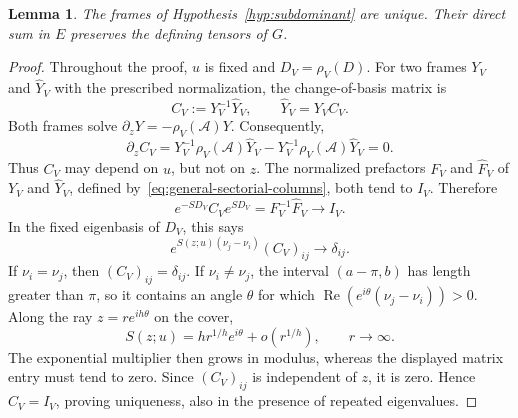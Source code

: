 \documentclass[11pt,leqno]{amsart}
\numberwithin{equation}{section}
\theoremstyle{plain}
\newtheorem{lemma}[theorem]{Lemma}
\theoremstyle{definition}
\theoremstyle{plain}
\theoremstyle{definition}
\theoremstyle{remark}
\begin{document}
\begin{lemma}\label{lem:leading-sectorial-tensors}
The frames of Hypothesis~\ref{hyp:subdominant} are unique.  Their direct sum in $E$ preserves the defining tensors of $G$.
\end{lemma}
\begin{proof}
Throughout the proof, $u$ is fixed and $D_V=\rho_V(D)$.  For two frames $Y_V$ and $\widehat Y_V$ with the prescribed normalization, the change-of-basis matrix is
\[
 C_V:=Y_V^{-1}\widehat Y_V,\qquad \widehat Y_V=Y_VC_V.
\]
Both frames solve $\partial_zY=-\rho_V(\mathscr A)Y$.  Consequently,
\[
 \partial_zC_V
 =Y_V^{-1}\rho_V(\mathscr A)\widehat Y_V
    -Y_V^{-1}\rho_V(\mathscr A)\widehat Y_V=0.
\]
Thus $C_V$ may depend on $u$, but not on $z$.  The normalized prefactors $F_V$ and $\widehat F_V$ of $Y_V$ and $\widehat Y_V$, defined by~\eqref{eq:general-sectorial-columns}, both tend to $I_V$.  Therefore
\[
 e^{-SD_V}C_Ve^{SD_V}=F_V^{-1}\widehat F_V\longrightarrow I_V.
\]
In the fixed eigenbasis of $D_V$, this says
\[
 e^{S(z;u)(\nu_j-\nu_i)}(C_V)_{ij}\longrightarrow\delta_{ij}.
\]
If $\nu_i=\nu_j$, then $(C_V)_{ij}=\delta_{ij}$.  If $\nu_i\ne\nu_j$, the interval $(a-\pi,b)$ has length greater than $\pi$, so it contains an angle $\theta$ for which
$\operatorname{Re}(e^{i\theta}(\nu_j-\nu_i))>0$.
Along the ray $z=re^{ih\theta}$ on the cover,
\[
 S(z;u)=hr^{1/h}e^{i\theta}+o(r^{1/h}),\qquad r\to\infty.
\]
The exponential multiplier then grows in modulus, whereas the displayed matrix entry must tend to zero.  Since $(C_V)_{ij}$ is independent of $z$, it is zero.  Hence $C_V=I_V$, proving uniqueness, also in the presence of repeated eigenvalues.


\end{proof}
\end{document}
